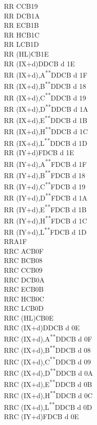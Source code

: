 \documentclass[12pt,twoside,openright,a4paper]{book}
\newcommand{\UNDOC}{\textnormal{\textsuperscript{**}}}
\begin{document}
\begin{multicols}{3}
{\begin{tabbing}
		RR C\>CB19\\
		RR D\>CB1A\\
		RR E\>CB1B\\
		RR H\>CB1C\\
		RR L\>CB1D\\
		RR (HL)\>CB1E\\
		RR (IX+d)\>DDCB d 1E\\
		RR (IX+d),A\UNDOC\>DDCB d 1F\\
		RR (IX+d),B\UNDOC\>DDCB d 18\\
		RR (IX+d),C\UNDOC\>DDCB d 19\\
		RR (IX+d),D\UNDOC\>DDCB d 1A\\
		RR (IX+d),E\UNDOC\>DDCB d 1B\\
		RR (IX+d),H\UNDOC\>DDCB d 1C\\
		RR (IX+d),L\UNDOC\>DDCB d 1D\\
		RR (IY+d)\>FDCB d 1E\\
		RR (IY+d),A\UNDOC\>FDCB d 1F\\
		RR (IY+d),B\UNDOC\>FDCB d 18\\
		RR (IY+d),C\UNDOC\>FDCB d 19\\
		RR (IY+d),D\UNDOC\>FDCB d 1A\\
		RR (IY+d),E\UNDOC\>FDCB d 1B\\
		RR (IY+d),H\UNDOC\>FDCB d 1C\\
		RR (IY+d),L\UNDOC\>FDCB d 1D\\
		RRA\>1F\\
		RRC A\>CB0F\\
		RRC B\>CB08\\
		RRC C\>CB09\\
		RRC D\>CB0A\\
		RRC E\>CB0B\\
		RRC H\>CB0C\\
		RRC L\>CB0D\\
		RRC (HL)\>CB0E\\
		RRC (IX+d)\>DDCB d 0E\\
		RRC (IX+d),A\UNDOC\>DDCB d 0F\\
		RRC (IX+d),B\UNDOC\>DDCB d 08\\
		RRC (IX+d),C\UNDOC\>DDCB d 09\\
		RRC (IX+d),D\UNDOC\>DDCB d 0A\\
		RRC (IX+d),E\UNDOC\>DDCB d 0B\\
		RRC (IX+d),H\UNDOC\>DDCB d 0C\\
		RRC (IX+d),L\UNDOC\>DDCB d 0D\\
		RRC (IY+d)\>FDCB d 0E\\

\end{tabbing}}
\end{multicols}
\end{document}
